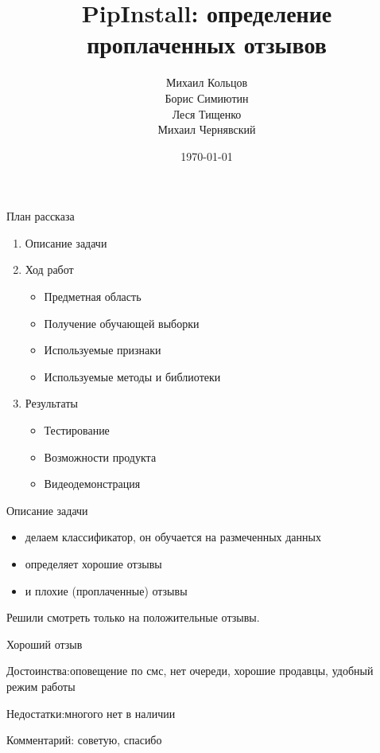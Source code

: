 \documentclass[mathserif,utf8,14pt]{beamer}
\title{PipInstall: определение проплаченных отзывов}
\author{Михаил Кольцов \\ Борис Симиютин \\ Леся Тищенко \\ Михаил Чернявский}
\date{\today}
\begin{document}
\begin{frame}
    \maketitle
\end{frame}

\begin{frame}{План рассказа}
    \begin{enumerate}
        \item Описание задачи
        \item Ход работ
            \begin{itemize}
                \item Предметная область
                \item Получение обучающей выборки
                \item Используемые признаки
                \item Используемые методы и библиотеки
            \end{itemize}
        \item Результаты
            \begin{itemize}
                \item Тестирование
                \item Возможности продукта
                \item Видеодемонстрация
            \end{itemize}
    \end{enumerate}
\end{frame}

\begin{frame}{Описание задачи}
    \begin{itemize}
        \item делаем классификатор, он обучается на размеченных данных
        \item определяет хорошие отзывы
        \item и плохие (проплаченные) отзывы
    \end{itemize}
    Решили смотреть только на положительные отзывы.
\end{frame}

\begin{frame}{Хороший отзыв}
     \addtocounter{framenumber}{-1}
    Достоинства:оповещение по смс, нет очереди, хорошие продавцы, удобный режим работы

    Недостатки:многого нет в наличии

    Комментарий: советую, спасибо
\end{frame}
\end{document}
